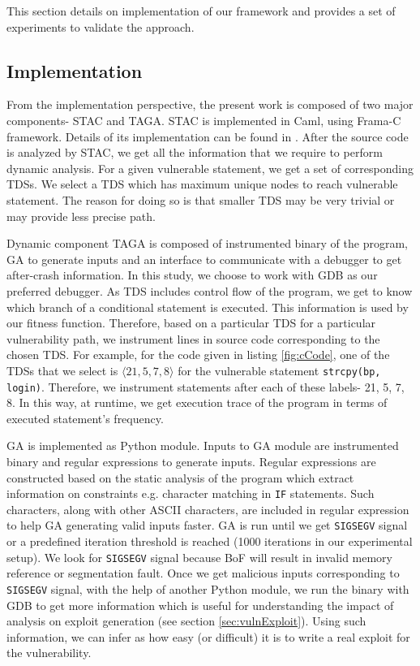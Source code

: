 This section details on implementation of our framework and provides a set of experiments to validate the approach.
\subsection{Implementation}
From the implementation perspective, the present work is composed of two major components- STAC and TAGA. STAC is implemented in Caml, using Frama-C framework. Details of its implementation can be found in \cite{dumitru_tds10}. After the source code is analyzed by STAC, we get all the information that we require to perform dynamic analysis. For a given vulnerable statement, we get a set of corresponding TDSs. We select a TDS which has maximum unique nodes to reach vulnerable statement. The reason for doing so is that smaller TDS may be very trivial or may provide less precise path. \par Dynamic component TAGA is composed of instrumented binary of the program, GA to generate inputs and an interface to communicate with a debugger to get after-crash information. In this study, we choose to work with GDB as our preferred debugger. As TDS includes control flow of the program, we get to know which branch of a conditional statement is executed. This information is used by our fitness function. Therefore, based on a particular TDS for a particular vulnerability path, we instrument lines in source code corresponding to the chosen TDS. For example, for the code given in listing \ref{fig:cCode}, one of the TDSs that we select is $\langle21,5,7,8\rangle$ for the vulnerable statement \texttt{strcpy(bp, login)}. Therefore, we instrument statements after each of these labels- 21, 5, 7, 8. In this way, at runtime, we get execution trace of the program in terms of executed statement's frequency.\par GA is implemented as Python module. Inputs to GA module are instrumented binary and regular expressions to generate inputs. Regular expressions are constructed based on the static analysis of the program which extract information on constraints e.g. character matching in \texttt{IF} statements. Such characters, along with other ASCII characters, are included in regular expression to help GA generating valid inputs faster. GA is run until we get \texttt{SIGSEGV} signal or a predefined iteration threshold is reached (1000 iterations in our experimental setup). We look for \texttt{SIGSEGV} signal because BoF will result in invalid memory reference or segmentation fault. Once we get malicious inputs corresponding to \texttt{SIGSEGV} signal, with the help of another Python module, we run the binary with GDB to get more information which is useful for understanding the impact of analysis on exploit generation (see section \ref{sec:vulnExploit}). Using such information, we can infer as how easy (or difficult) it is to write a real exploit for the vulnerability.
